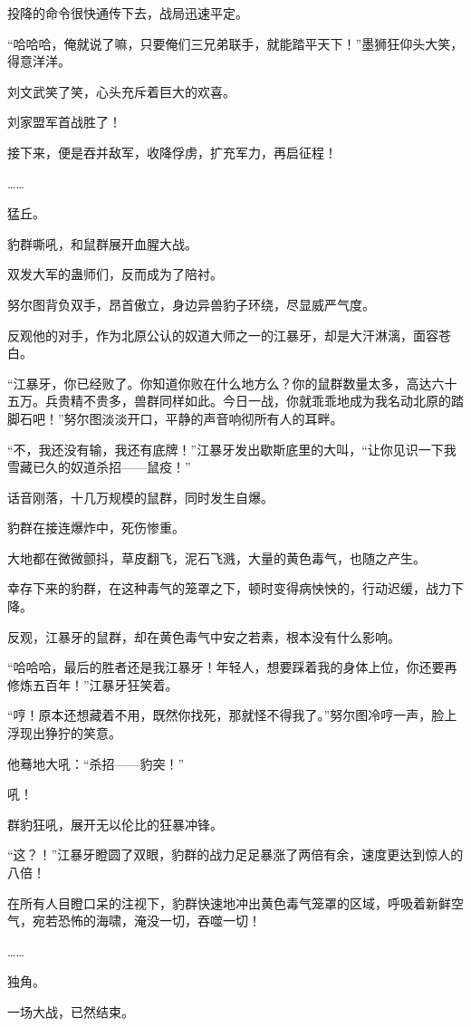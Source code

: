 \begin{this_body}
投降的命令很快通传下去，战局迅速平定。

“哈哈哈，俺就说了嘛，只要俺们三兄弟联手，就能踏平天下！”墨狮狂仰头大笑，得意洋洋。

刘文武笑了笑，心头充斥着巨大的欢喜。

刘家盟军首战胜了！

接下来，便是吞并敌军，收降俘虏，扩充军力，再启征程！

……

猛丘。

豹群嘶吼，和鼠群展开血腥大战。

双发大军的蛊师们，反而成为了陪衬。

努尔图背负双手，昂首傲立，身边异兽豹子环绕，尽显威严气度。

反观他的对手，作为北原公认的奴道大师之一的江暴牙，却是大汗淋漓，面容苍白。

“江暴牙，你已经败了。你知道你败在什么地方么？你的鼠群数量太多，高达六十五万。兵贵精不贵多，兽群同样如此。今日一战，你就乖乖地成为我名动北原的踏脚石吧！”努尔图淡淡开口，平静的声音响彻所有人的耳畔。

“不，我还没有输，我还有底牌！”江暴牙发出歇斯底里的大叫，“让你见识一下我雪藏已久的奴道杀招——鼠疫！”

话音刚落，十几万规模的鼠群，同时发生自爆。

豹群在接连爆炸中，死伤惨重。

大地都在微微颤抖，草皮翻飞，泥石飞溅，大量的黄色毒气，也随之产生。

幸存下来的豹群，在这种毒气的笼罩之下，顿时变得病怏怏的，行动迟缓，战力下降。

反观，江暴牙的鼠群，却在黄色毒气中安之若素，根本没有什么影响。

“哈哈哈，最后的胜者还是我江暴牙！年轻人，想要踩着我的身体上位，你还要再修炼五百年！”江暴牙狂笑着。

“哼！原本还想藏着不用，既然你找死，那就怪不得我了。”努尔图冷哼一声，脸上浮现出狰狞的笑意。

他蓦地大吼：“杀招——豹突！”

吼！

群豹狂吼，展开无以伦比的狂暴冲锋。

“这？！”江暴牙瞪圆了双眼，豹群的战力足足暴涨了两倍有余，速度更达到惊人的八倍！

在所有人目瞪口呆的注视下，豹群快速地冲出黄色毒气笼罩的区域，呼吸着新鲜空气，宛若恐怖的海啸，淹没一切，吞噬一切！

……

独角。

一场大战，已然结束。


\end{this_body}
